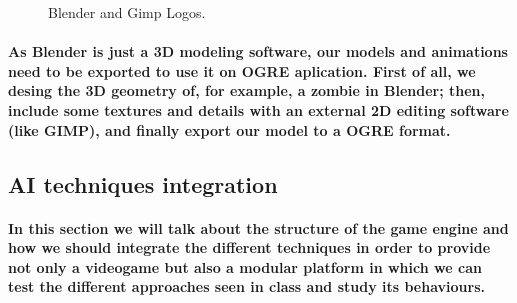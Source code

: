 \documentclass[a4paper,10pt]{article}
\newcommand{\p}[1]{\paragraph{\indent\textnormal{#1}}}
\begin{document}
  \begin{figure}[hbt]
      \centering
       \qquad
      \caption{Blender and Gimp Logos.}
      \label{fig:res}
   \end{figure}

    \p{As Blender is just a 3D modeling software, our models and animations need to be exported to use it on OGRE aplication. First of all, we desing the 3D geometry of, for example, a zombie in Blender; then, include some textures and details with an external 2D editing software (like GIMP), and finally export our model to a OGRE format.}


  \subsection{AI techniques integration}

  \p{In this section we will talk about the structure of the game engine and how we should integrate the different techniques in order to provide not only a videogame but also a modular platform in which we can test the different approaches seen in class and study its behaviours.}
\end{document}
